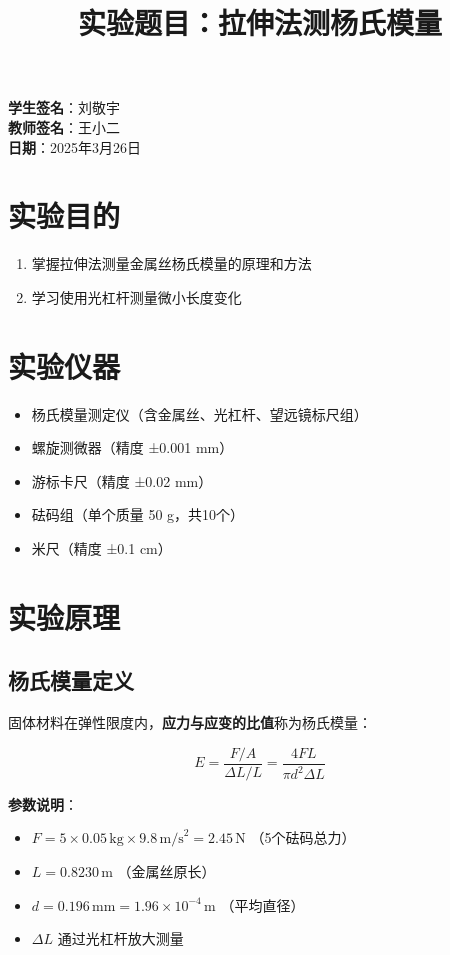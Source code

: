 \documentclass[12pt,a4paper]{article}
\title{实验题目：拉伸法测杨氏模量}
\author{}
\date{}
\begin{document}
\maketitle

\textbf{学生签名}：刘敬宇\\
\textbf{教师签名}：王小二\\
\textbf{日期}：2025年3月26日

\section{实验目的}

\begin{enumerate}
\item 掌握拉伸法测量金属丝杨氏模量的原理和方法
\item 学习使用光杠杆测量微小长度变化
\end{enumerate}

\section{实验仪器}

\begin{itemize}
\item 杨氏模量测定仪（含金属丝、光杠杆、望远镜标尺组）
\item 螺旋测微器（精度 ±0.001 mm）
\item 游标卡尺（精度 ±0.02 mm）
\item 砝码组（单个质量 50 g，共10个）
\item 米尺（精度 ±0.1 cm）
\end{itemize}

\section{实验原理}

\subsection{杨氏模量定义}

固体材料在弹性限度内，\textbf{应力与应变的比值}称为杨氏模量：

\begin{equation}
E = \frac{F/A}{\Delta L/L} = \frac{4FL}{\pi d^2 \Delta L}
\end{equation}

\textbf{参数说明}：
\begin{itemize}
\item $F = 5 \times 0.05 \, \text{kg} \times 9.8 \, \text{m/s}^2 = 2.45 \, \text{N}$ （5个砝码总力）
\item $L = 0.8230 \, \text{m}$ （金属丝原长）
\item $d = 0.196 \, \text{mm} = 1.96 \times 10^{-4} \, \text{m}$ （平均直径）
\item $\Delta L$ 通过光杠杆放大测量
\end{itemize}
\end{document}
